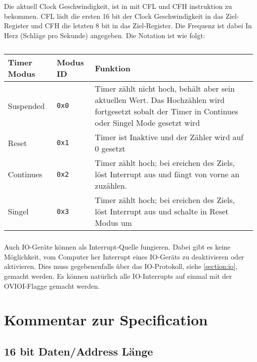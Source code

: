 \documentclass{scrartcl}
\begin{document}
Die aktuell Clock Geschwindigkeit, ist in mit CFL und CFH instruktion zu bekommen.
CFL lädt die ersten 16 bit der Clock Geschwindigkeit in das Ziel-Register und CFH die letzten 8 bit in das Ziel-Register.
Die Frequenz ist dabei In Herz (Schläge pro Sekunde) angegeben.
Die Notation ist wie folgt:



\begin{center}
	\begin{table}
		\caption{\label{table:TimerModi}}
		\begin{tabular}{l  l | L{9cm}}
			Timer Modus & Modus ID & Funktion \\
			\hline
			Suspended & \texttt{0x0} & Timer zählt nicht hoch, behält aber sein aktuellen Wert. Das Hochzählen wird fortgesetzt sobalt der Timer in Continues oder Singel Mode gesetzt wird \\
			Reset & \texttt{0x1} & Timer ist Inaktive und der Zähler wird auf 0 gesetzt \\
			Continues & \texttt{0x2} & Timer zählt hoch; bei ereichen des Ziels, löst Interrupt aus und fängt von vorne an zuzählen. \\
			Singel & \texttt{0x3} & Timer zählt hoch; bei ereichen des Ziels, löst Interrupt aus und schalte in Reset Modus um
		\end{tabular}
	\end{table}
\end{center}

\subsubsection{\label{section:ioInterrupt}}

Auch IO-Geräte können als Interrupt-Quelle fungieren.
Dabei gibt es keine Möglichkeit, vom Computer her Interrupt eines IO-Geräts zu deaktivieren oder aktivieren.
Dies muss gegebenenfalls über das IO-Protokoll, siehe \autoref{section:io}, gemacht werden.
Es können natürlich alle IO-Interrupts auf einmal mit der OVIOI-Flagge gemacht werden.

\section{Kommentar zur Specification}

\subsection{\label{section:comment:datalength}16 bit Daten/Address Länge}
\end{document}
